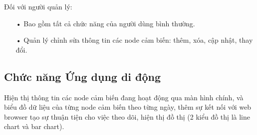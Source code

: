 Đối với người quản lý:
\begin{itemize}
\item[•] Bao gồm tất cả chức năng của người dùng bình thường.
\item[•] Quản lý chỉnh sửa thông tin các node cảm biến: thêm, xóa, cập nhật, thay đổi.
\end{itemize}

\subsection*{Chức năng Ứng dụng di động}
Hiện thị thông tin các node cảm biến đang hoạt động qua màn hình chính, và biểu đồ dữ liệu của từng node cảm biến theo từng ngày, thêm sự kết nối với web browser tạo sự thuận tiện cho việc theo dõi, hiện thị đồ thị (2 kiểu đồ thị là line chart và bar chart).

